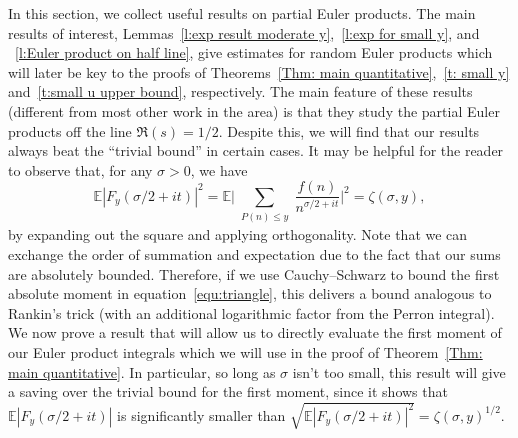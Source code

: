 \documentclass[12pt,a4paper,reqno]{amsart}
\numberwithin{equation}{section}
\def\E{\mathbb E}
\def\leq {\leqslant}
\theoremstyle{remark}
\theoremstyle{definition}
\numberwithin{equation}{section}
\theoremstyle{remark}
\def\E{\mathbb E}
\begin{document}
In this section, we collect useful results on partial Euler products. The main results of interest, Lemmas~\ref{l:exp result moderate y},~\ref{l:exp for small y}, and ~\ref{l:Euler product on half line}, give estimates for random Euler products which will later be key to the proofs of Theorems~\ref{Thm: main quantitative},~\ref{t: small y} and~\ref{t:small u upper bound}, respectively. The main feature of these results (different from most other work in the area) is that they study the partial Euler products off the line $\Re(s) = 1/2$. Despite this, we will find that our results always beat the ``trivial bound'' in certain cases. It may be helpful for the reader to observe that, for any $\sigma > 0$, we have
\begin{equation}\label{equ: trivial EP bound}
\E |F_y (\sigma / 2 + it)|^2 = \E \biggl| \sum_{\substack{P(n) \leq y}} \frac{f(n)}{n^{\sigma/2 + it}} \biggr|^2 = \zeta (\sigma, y),
\end{equation}
by expanding out the square and applying orthogonality. Note that we can exchange the order of summation and expectation due to the fact that our sums are absolutely bounded. Therefore, if we use Cauchy--Schwarz to bound the first absolute moment in equation~\eqref{equ:triangle}, this delivers a bound analogous to Rankin's trick (with an additional logarithmic factor from the Perron integral). We now prove a result that will allow us to directly evaluate the first moment of our Euler product integrals which we will use in the proof of Theorem~\ref{Thm: main quantitative}. In particular, so long as $\sigma$ isn't too small, this result will give a saving over the trivial bound for the first moment, since it shows that $\E |F_y (\sigma/2+it)|$ is significantly smaller than $\sqrt{\E|F_y (\sigma / 2 + it)|^2} = \zeta(\sigma, y)^{1/2}$.
\end{document}
